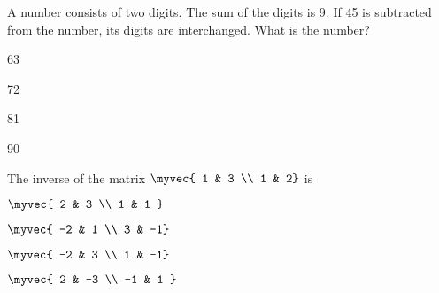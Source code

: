 \item A number consists of two digits. The sum of the digits is 9. If 45 is subtracted from the number, its digits are interchanged. What is the number? 
\hfill{}\begin{enumerate}
\begin{multicols}{4}
\item 63  \item 72  \item 81 \item 90    
\end{multicols}
\end{enumerate}
\item The inverse of the matrix $\myvec{ 1 & 3 \\ 1 & 2}$ is 
\hfill{}
\begin{enumerate}
\begin{multicols}{4}
\item $\myvec{ 2 & 3 \\ 1 & 1 }$ 
\item $\myvec{ -2 & 1 \\ 3 & -1}$ 
\item $\myvec{ -2 & 3 \\ 1 & -1}$ 
\item $\myvec{ 2 & -3 \\ -1 & 1 }$
\end{multicols}
\end{enumerate}

